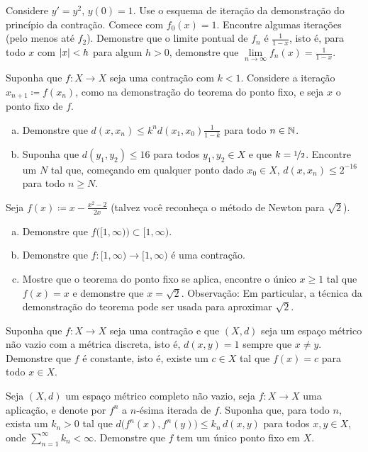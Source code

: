 \begin{exercise}
Considere $y' =y^2$, $y(0)=1$. Use o esquema de iteração
da demonstração do princípio da contração.
Comece com $f_0(x) = 1$. Encontre algumas
iterações (pelo menos até $f_2$). Demonstre que
o limite pontual de $f_n$ é $\frac{1}{1-x}$, isto é, para todo $x$
com $\lvert {x} \rvert < h$ para algum $h > 0$,
demonstre que $\lim\limits_{n\to\infty}f_n(x) = \frac{1}{1-x}$.
\end{exercise}

\begin{exercise}
Suponha que $f \colon X \to X$ seja uma contração com $k < 1$. Considere a iteração $x_{n+1} \coloneqq f(x_n)$, como na demonstração do teorema do ponto fixo,
e seja $x$ o ponto fixo de $f$.
\begin{enumerate}[a)]
\item
Demonstre que $d(x,x_n) \leq k^n d(x_1,x_0) \frac{1}{1-k}$ para todo $n \in {\mathbb{N}}$.
\item
Suponha que $d(y_1,y_2) \leq 16$ para todos $y_1,y_2 \in X$ e que $k=
\nicefrac{1}{2}$. Encontre um $N$ tal que, começando em qualquer ponto dado $x_0 \in X$,
$d(x,x_n) \leq 2^{-16}$ para todo $n \geq N$.
\end{enumerate}
\end{exercise}

\begin{exercise}
Seja $f(x) \coloneqq x-\frac{x^2-2}{2x}$ (talvez você reconheça o método de Newton para
$\sqrt{2}$).
\begin{enumerate}[a)]
\item
Demonstre que $f\bigl([1,\infty)\bigr) \subset [1,\infty)$.
\item
Demonstre que $f \colon [1,\infty) \to [1,\infty)$ é uma contração.
\item
Mostre que o teorema do ponto fixo se aplica,
encontre o único $x \geq 1$ tal que $f(x) = x$
e demonstre que $x = \sqrt{2}$.
Observação: Em particular, a técnica da demonstração do teorema
pode ser usada para aproximar $\sqrt{2}$.
\end{enumerate}
\end{exercise}

\begin{exercise}
Suponha que $f \colon X \to X$ seja uma contração e que $(X,d)$ seja um espaço métrico não vazio
com a métrica discreta, isto é, $d(x,y) = 1$ sempre que $x \neq y$.
Demonstre que $f$ é constante, isto é,
existe um $c \in X$ tal que $f(x) = c$ para todo $x \in X$.
\end{exercise}

\begin{exercise}
Seja $(X,d)$ um espaço métrico completo não vazio,
seja $f \colon X \to X$ uma aplicação, e denote
por $f^n$ a $n$-ésima iterada de $f$. Suponha que,
para todo $n$, exista um $k_n > 0$ tal que
$d\bigl(f^n(x),f^n(y)\bigr) \leq k_n \, d(x,y)$
para todos $x,y \in X$,
onde $\sum_{n=1}^\infty k_n < \infty$.
Demonstre que $f$ tem um único ponto fixo em $X$.
\end{exercise}
